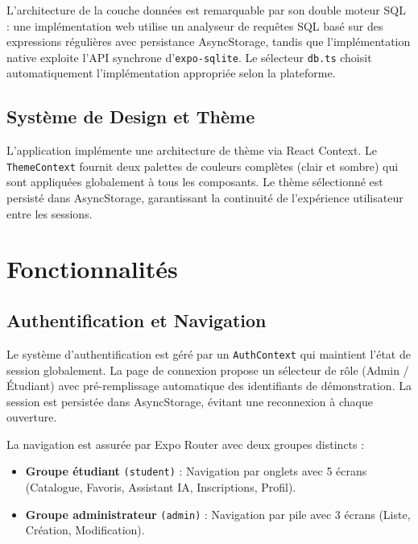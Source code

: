 \documentclass[a4paper,12pt]{report}
\begin{document}
L'architecture de la couche donn\'{e}es est remarquable par son double moteur SQL : une impl\'{e}mentation web utilise un analyseur de requ\^{e}tes SQL bas\'{e} sur des expressions r\'{e}guli\`{e}res avec persistance AsyncStorage, tandis que l'impl\'{e}mentation native exploite l'API synchrone d'\texttt{expo-sqlite}. Le s\'{e}lecteur \texttt{db.ts} choisit automatiquement l'impl\'{e}mentation appropri\'{e}e selon la plateforme.

\section{Syst\`{e}me de Design et Th\`{e}me}

L'application impl\'{e}mente une architecture de th\`{e}me via React Context. Le \texttt{ThemeContext} fournit deux palettes de couleurs compl\`{e}tes (clair et sombre) qui sont appliqu\'{e}es globalement \`{a} tous les composants. Le th\`{e}me s\'{e}lectionn\'{e} est persist\'{e} dans AsyncStorage, garantissant la continuit\'{e} de l'exp\'{e}rience utilisateur entre les sessions.

\newpage

\chapter{Fonctionnalit\'{e}s}

\section{Authentification et Navigation}

Le syst\`{e}me d'authentification est g\'{e}r\'{e} par un \texttt{AuthContext} qui maintient l'\'{e}tat de session globalement. La page de connexion propose un s\'{e}lecteur de r\^{o}le (Admin / \'{E}tudiant) avec pr\'{e}-remplissage automatique des identifiants de d\'{e}monstration. La session est persist\'{e}e dans AsyncStorage, \'{e}vitant une reconnexion \`{a} chaque ouverture.

La navigation est assur\'{e}e par Expo Router avec deux groupes distincts :

\begin{itemize}[leftmargin=2em]
    \item \textbf{Groupe \'{e}tudiant} \texttt{(student)} : Navigation par onglets avec 5 \'{e}crans (Catalogue, Favoris, Assistant IA, Inscriptions, Profil).
    \item \textbf{Groupe administrateur} \texttt{(admin)} : Navigation par pile avec 3 \'{e}crans (Liste, Cr\'{e}ation, Modification).
\end{itemize}
\end{document}
